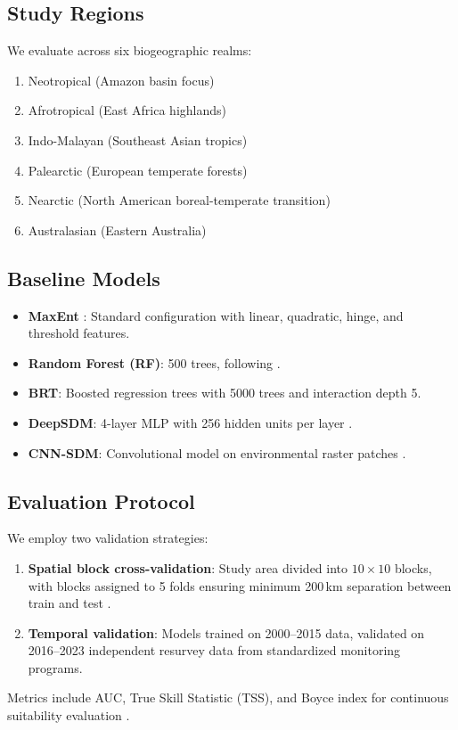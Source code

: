 \subsection{Study Regions}

We evaluate across six biogeographic realms:
\begin{enumerate}
  \item Neotropical (Amazon basin focus)
  \item Afrotropical (East Africa highlands)
  \item Indo-Malayan (Southeast Asian tropics)
  \item Palearctic (European temperate forests)
  \item Nearctic (North American boreal-temperate transition)
  \item Australasian (Eastern Australia)
\end{enumerate}

\subsection{Baseline Models}

\begin{itemize}
  \item \textbf{MaxEnt} \citep{phillips2006maximum}: Standard
    configuration with linear, quadratic, hinge, and threshold features.
  \item \textbf{Random Forest (RF)}: 500 trees, following
    \citet{cutler2007random}.
  \item \textbf{BRT}: Boosted regression trees \citep{elith2008working}
    with 5000 trees and interaction depth 5.
  \item \textbf{DeepSDM}: 4-layer MLP with 256 hidden units per layer
    \citep{botella2018deep}.
  \item \textbf{CNN-SDM}: Convolutional model on environmental raster
    patches \citep{deneu2021convolutional}.
\end{itemize}

\subsection{Evaluation Protocol}

We employ two validation strategies:
\begin{enumerate}
  \item \textbf{Spatial block cross-validation}: Study area divided into
    $10 \times 10$ blocks, with blocks assigned to 5 folds ensuring
    minimum 200\,km separation between train and test
    \citep{roberts2017cross}.
  \item \textbf{Temporal validation}: Models trained on 2000--2015 data,
    validated on 2016--2023 independent resurvey data from standardized
    monitoring programs.
\end{enumerate}

Metrics include AUC, True Skill Statistic (TSS), and Boyce index for
continuous suitability evaluation \citep{hirzel2006evaluating}.


